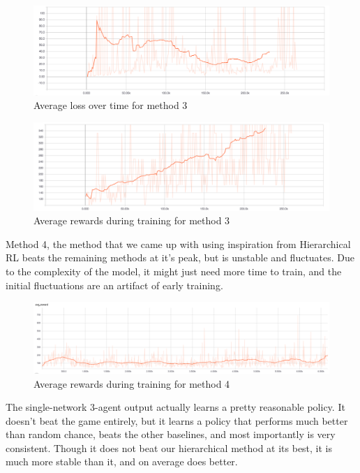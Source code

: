 \documentclass{article}
\begin{document}
\begin{figure}[H]
\centering
\includegraphics[scale=0.17]{message_passing_loss.png}
\caption{Average loss over time for method 3}
\end{figure}

\begin{figure}[H]
\centering
\includegraphics[scale=0.17]{message_passing_reward.png}
\caption{Average rewards during training for method 3}
\end{figure}


Method 4, the method that we came up with using inspiration from
Hierarchical RL beats the remaining methods at it's peak, but is unstable
and fluctuates. Due to the complexity of the model, it might just need more
time to train, and the initial fluctuations are an artifact of early
training.

\begin{figure}[H]
\centering
\includegraphics[scale=0.17]{hierarchical_reward.png}
\caption{Average rewards during training for method 4}
\end{figure}


The single-network 3-agent output actually learns a pretty reasonable policy. It
doesn't beat the game entirely, but it learns a policy that performs much better
than random chance, beats the other baselines, and most importantly is very
consistent. Though it does not beat our hierarchical method at its best, it is
much more stable than it, and on average does better.
\end{document}
